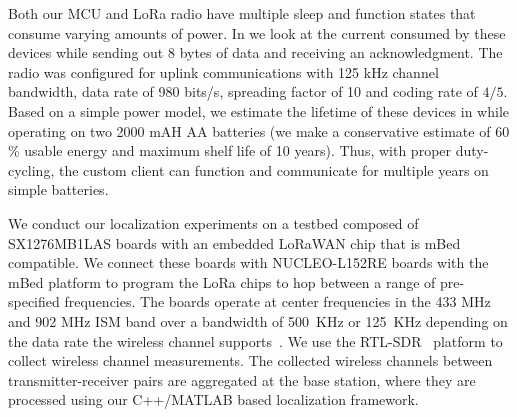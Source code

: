 



Both our MCU and LoRa radio have multiple sleep and function states that consume varying amounts of power. In  we look at the current consumed by these devices while sending out 8 bytes of data and receiving an acknowledgment. The radio was configured for uplink communications with 125 kHz channel bandwidth, data rate of 980 bits/s, spreading factor of 10 and coding rate of $4/5$.  Based on a simple power model, we estimate the lifetime of these devices in  while operating on two 2000 mAH AA batteries (we make a conservative estimate of 60 \% usable energy and maximum shelf life of 10 years). Thus, with proper duty-cycling, the custom client can function and communicate for multiple years on simple batteries.





\vspace*{0.1cm} We conduct our localization experiments on a testbed composed of SX1276MB1LAS boards with an embedded LoRaWAN chip that
is mBed compatible. We connect these boards with NUCLEO-L152RE boards with the mBed platform to program the LoRa chips to hop between a range of pre-specified frequencies. The boards operate at  center frequencies in the 433 MHz and 902 MHz ISM band over a bandwidth of 500~KHz or 125~KHz depending on the
data rate the wireless channel supports~\cite{alliance2015lorawan}. We use the RTL-SDR~\cite{rtlsdr} platform to collect wireless channel measurements. The collected  wireless channels between transmitter-receiver pairs are aggregated at the base station, where they are processed using our C++/MATLAB based localization framework.










